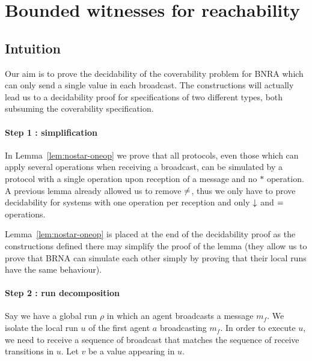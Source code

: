 \section{Bounded witnesses for reachability}

\subsection{Intuition}

Our aim is to prove the decidability of the coverability problem for BNRA which can only send a single value in each broadcast. The constructions will actually lead us to a decidability proof for specifications of two different types, both subsuming the coverability specification.

\paragraph*{Step 1 : simplification} In Lemma~\ref{lem:nostar-oneop} we prove that all protocols, even those which can apply several operations when receiving a broadcast, can be simulated by a protocol with a single operation upon reception of a message and no $*$ operation. A previous lemma already allowed us to remove ${\ne}$, thus we only have to prove decidability for systems with one operation per reception and only $\downarrow$ and ${=}$ operations.

Lemma~\ref{lem:nostar-oneop} is placed at the end of the decidability proof as the constructions defined there may simplify the proof of the lemma (they allow us to prove that BRNA can simulate each other simply by proving that their local runs have the same behaviour).

\paragraph*{Step 2 : run decomposition} Say we have a global run $\rho$ in which an agent broadcasts a message $m_f$. We isolate the local run $u$ of the first agent $a$ broadcasting $m_f$.
In order to execute $u$, we need to receive a sequence of broadcast that matches the sequence of receive transitions in $u$. Let $v$ be a value appearing in $u$.

